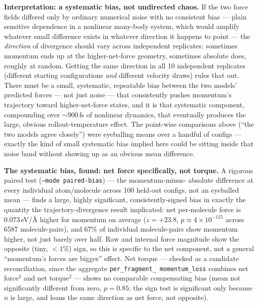 \documentclass[11pt]{article}
\begin{document}
\textbf{Interpretation: a systematic bias, not undirected chaos.} If the two
force fields differed only by ordinary numerical noise with no consistent
bias --- plain sensitive dependence in a nonlinear many-body system, which
would amplify whatever small difference exists in whatever direction it
happens to point --- the \emph{direction} of divergence should vary across
independent replicates: sometimes momentum ends up at the higher-net-force
geometry, sometimes absolute does, roughly at random. Getting the same
direction in all 10 independent replicates (different starting
configurations \emph{and} different velocity draws) rules that out. There
must be a small, systematic, repeatable bias between the two models'
predicted forces --- not just noise --- that consistently pushes momentum's
trajectory toward higher-net-force states, and it is that systematic
component, compounding over $\sim$900\,fs of nonlinear dynamics, that
eventually produces the large, obvious rollout-temperature effect. The
point-wise comparisons above (``the two models agree closely'') were
eyeballing means over a handful of configs --- exactly the kind of small
systematic bias implied here could be sitting inside that noise band without
showing up as an obvious mean difference.

\textbf{The systematic bias, found: net force specifically, not torque.} A
rigorous paired test (\texttt{--mode paired-bias}) --- the momentum-minus-
absolute difference at every individual atom/molecule across 100 held-out
configs, not an eyeballed mean --- finds a large, highly significant,
consistently-signed bias in exactly the quantity the trajectory-divergence
result implicated: net per-molecule force is $0.073$\,eV/\AA{} higher for
momentum on average ($z=+23.8$, $p\approx4{\times}10^{-125}$ across 6587
molecule-pairs), and 67\% of individual molecule-pairs show momentum higher,
not just barely over half. Raw and internal force magnitude show the
opposite (tiny, $<1\%$) sign, so this is specific to the net component, not
a general ``momentum's forces are bigger'' effect. Net torque --- checked as
a candidate reconciliation, since the aggregate \texttt{per\_fragment\_
momentum\_loss} combines net force$^2$ and net torque$^2$ --- shows no
comparable compensating bias (mean not significantly different from zero,
$p=0.85$; the sign test is significant only because $n$ is large, and leans
the same direction as net force, not opposite).
\end{document}
